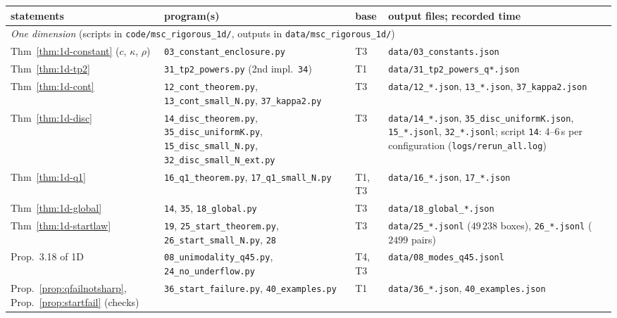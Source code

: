 \documentclass[10pt,a4paper]{article}
\theoremstyle{plain}
\theoremstyle{definition}
\newcommand{\ONE}{\textsf{1D}}
\begin{document}
\begin{center}\footnotesize
\begin{longtable}{p{}p{}p{}p{}}
\toprule
statements & program(s) & base & output files; recorded time\\
\midrule
\endhead
\multicolumn{4}{p{0.9\textwidth}}{\emph{One dimension} (scripts in \texttt{code/msc\_rigorous\_1d/}, outputs in \texttt{data/msc\_rigorous\_1d/})}\\
Thm~\ref{thm:1d-constant} ($c$, $\kappa$, $\rho$) & \texttt{03\_constant\_enclosure.py} & T3 & \texttt{data/03\_constants.json}\\
Thm~\ref{thm:1d-tp2} & \texttt{31\_tp2\_powers.py} (2nd impl.\ \texttt{34}) & T1 & \texttt{data/31\_tp2\_powers\_q*.json}\\
Thm~\ref{thm:1d-cont} & \texttt{12\_cont\_theorem.py}, \texttt{13\_cont\_small\_N.py}, \texttt{37\_kappa2.py} & T3 & \texttt{data/12\_*.json}, \texttt{13\_*.json}, \texttt{37\_kappa2.json}\\
Thm~\ref{thm:1d-disc} & \texttt{14\_disc\_theorem.py}, \texttt{35\_disc\_uniformK.py}, \texttt{15\_disc\_small\_N.py}, \texttt{32\_disc\_small\_N\_ext.py} & T3 & \texttt{data/14\_*.json}, \texttt{35\_disc\_uniformK.json}, \texttt{15\_*.jsonl}, \texttt{32\_*.jsonl}; script \texttt{14}: 4--6\,s per configuration (\texttt{logs/rerun\_all.log})\\
Thm~\ref{thm:1d-q1} & \texttt{16\_q1\_theorem.py}, \texttt{17\_q1\_small\_N.py} & T1, T3 & \texttt{data/16\_*.json}, \texttt{17\_*.json}\\
Thm~\ref{thm:1d-global} & \texttt{14}, \texttt{35}, \texttt{18\_global.py} & T3 & \texttt{data/18\_global\_*.json}\\
Thm~\ref{thm:1d-startlaw} & \texttt{19}, \texttt{25\_start\_theorem.py}, \texttt{26\_start\_small\_N.py}, \texttt{28} & T3 & \texttt{data/25\_*.jsonl} ($49\,238$ boxes), \texttt{26\_*.jsonl} ($2499$ pairs)\\
Prop.~3.18 of \ONE & \texttt{08\_unimodality\_q45.py}, \texttt{24\_no\_underflow.py} & T4, T3 & \texttt{data/08\_modes\_q45.jsonl}\\
Prop.~\ref{prop:qfailnotsharp}, Prop.~\ref{prop:startfail} (checks) & \texttt{36\_start\_failure.py}, \texttt{40\_examples.py} & T1 & \texttt{data/36\_*.json}, \texttt{40\_examples.json}\\

\end{longtable}
\end{center}
\end{document}

